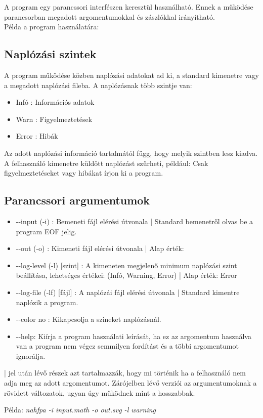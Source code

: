 \documentclass[../spec.tex]{subfiles}
\begin{document}
    A program egy parancssori interfészen keresztül használható.
    Ennek a működése parancsorban megadott argomentumokkal és zászlókkal irányítható.\\
    Példa a program használatára: \\

    \subsection{Naplózási szintek}\label{subsec:napló-szintek}
    A program működése közben naplózási adatokat ad ki, a standard kimenetre vagy a megadott naplózási fileba.
    A naplózásnak több szintje van:
    \begin{itemize}
        \item Infó : Információs adatok
        \item Warn : Figyelmeztetések
        \item Error : Hibák
    \end{itemize}
    Az adott naplózási információ tartalmától függ, hogy melyik szintben lesz kiadva.
    A felhasználó kimenetre küldött naplózást szűrheti, például: Csak figyelmeztetéseket vagy hibákat írjon ki a program.

    \subsection{Parancssori argumentumok}\label{subsec:args}
    \begin{itemize}
        \item -{}-input (-i) : Bemeneti fájl elérési útvonala | Standard bemenetről olvas be a program EOF jelig.
        \item -{}-out (-o) : Kimeneti fájl elérési útvonala | Alap érték: 
        \item -{}-log-level (-l) [szint] : A kimeneten megjelenő minimum naplózási szint beállítása,  lehetséges értékei:  (Infó, Warning, Error) | Alap érték: Error
        \item -{}-log-file (-lf) [fájl] : A naplózái fájl elérési útvonala | Standard kimentre naplózik a program.
        \item -{}-color no : Kikapcsolja a szineket naplózásnál.
        \item -{}-help: Kiírja a program használati leírását, ha ez az argomentum használva van a program nem végez semmilyen fordítást és a többi argomentumot ignorálja.
    \end{itemize}
    | jel után lévő részek azt tartalmazzák, hogy mi történik ha a felhasználó nem adja meg az adott argomentumot.
    Zárójelben lévő verziói az argumentumoknak a rövidett változatok, ugyan úgy működnek mint a hosszabbak.
    
    \begin{center}
        Példa: \textit{nahfpa -i input.math -o out.svg -l warning}
    \end{center}
\end{document}
